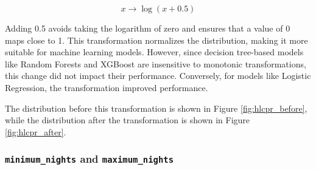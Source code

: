 \documentclass[12pt]{article}
\begin{document}
\[
x \to \log(x + 0.5)
\]

Adding 0.5 avoids taking the logarithm of zero and ensures that a value of 0 maps close to 1. This transformation normalizes the distribution, making it more suitable for machine learning models. However, since decision tree-based models like Random Forests and XGBoost are insensitive to monotonic transformations, this change did not impact their performance. Conversely, for models like Logistic Regression, the transformation improved performance.

The distribution before this transformation is shown in Figure \ref{fig:hlcpr_before}, while the distribution after the transformation is shown in Figure \ref{fig:hlcpr_after}.

\subsubsection{\texttt{minimum\_nights} and \texttt{maximum\_nights}}
\end{document}

